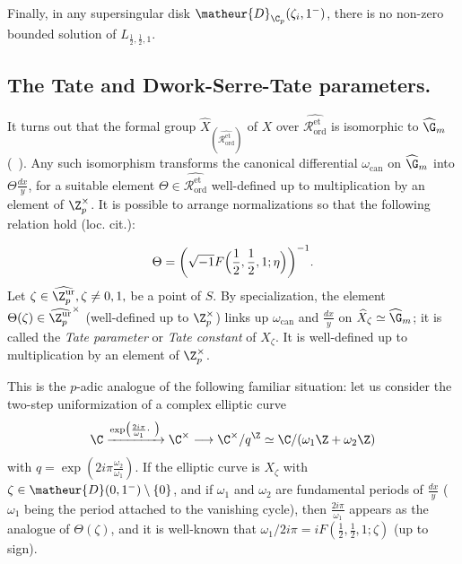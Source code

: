 \begin{para}
 Finally, in any supersingular disk $\matheur{D}_{{\C}_p}(\zeta_{i},1^-)$,
 there is no non-zero bounded solution of $L_{\frac{1}{2},\frac{1}{2},1}$.
\end{para}

\subsection{The Tate and Dwork-Serre-Tate parameters.}
\label{sub-serre-tate-para}

\begin{para}\label{para-tate-para}
 It turns out that the formal group
 ${\widehat{X}}_{(\widehat{\mathcal{R}_{\mathrm{ord}}^{\mathrm{et}}})}$
 of $X$ over $\widehat{\mathcal{R}_{\mathrm{ord}}^{\mathrm{et}}}$ is
 isomorphic to ${\widehat{\G}}_m$ (\cf~\cite[I]{fgade}). Any such
 isomorphism transforms the canonical differential
 $\omega_{\mathrm{can}}$ on ${\widehat{\G}}_m$ into
 $\Theta \frac{dx}{y}$, for a suitable element $\Theta \in
 \widehat{\mathcal{R}_{\mathrm{ord}}^{\mathrm{et}}}$ well-defined up to
 multiplication by an element of ${\Z}_p^{\times}$. It is possible to
 arrange normalizations so that the following relation hold (loc. cit.):
 
 \begin{equation*}
  \Theta
   = \biggl(\sqrt{-1}F\Bigl(\frac{1}{2},\frac{1}{2},1;\eta\Bigr)\biggr)^{-1}.
 \end{equation*}
 Let $\zeta\in \widehat{{\Z}_p^{\mathrm{ur}}}, \zeta \neq 0,1,$ be a point of
 $S$. By specialization, the element $\Theta(\zeta) \in
 \widehat{{\Z}_p^{\mathrm{ur}}}^{\times}$ (well-defined up to
 ${\Z}_p^{\times}$) links up $\omega_{\mathrm{can}}$ and $\frac{dx}{y}$ on
 $\widehat{X}_{\zeta}\simeq{\widehat{\G}}_m$; it is called the {\it Tate
 parameter} or {\it Tate constant} of $X_{\zeta}$.  It is well-defined
 up to multiplication by an element of ${\Z}_p^{\times}$.

 This is the $p$-adic analogue of the following familiar situation: let
 us consider the two-step uniformization of a complex elliptic curve
 \begin{equation*}
  \C \xrightarrow{\exp\bigl(\frac{2i\pi}{\omega_1}\cdot \;\,\bigr)}
   {\C}^{\times}
   \longrightarrow \C^{\times}/q^{\Z} \simeq
   {\C}/(\omega_1{\Z}+\omega_2{\Z})
 \end{equation*}
 with $q=\exp(2i\pi\frac{\omega_2}{\omega_1})$.  If the elliptic curve
 is $X_{\zeta}$ with $\zeta\in \matheur{D}(0,1^-)\setminus \lbrace
 0\rbrace$, and if $\omega_1$ and $\omega_2$ are fundamental periods of
 $\frac{dx}{y}$ ($\omega_1$ being the period attached to the vanishing
 cycle), then $\frac{2i\pi}{\omega_1}$ appears as the analogue of
 $\Theta(\zeta)$, and it is well-known that $\omega_1/2i\pi =
 iF(\frac{1}{2},\frac{1}{2},1;\zeta)$ (up to sign).
\end{para}

